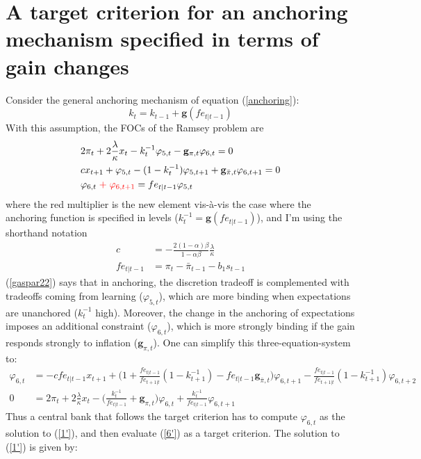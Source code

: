 \documentclass[11pt]{article}
\renewcommand{\[}{\begin{equation}}
\renewcommand{\]}{\end{equation}}
\begin{document}
\section{A target criterion for an anchoring mechanism specified in terms of gain changes}\label{app_generalTC}
Consider the general anchoring mechanism of equation (\ref{anchoring}):
\begin{equation}
k_t = k_{t-1} + \mathbf{g}(fe_{t|t-1})
\end{equation}
With this assumption, the FOCs of the Ramsey problem are
\begin{align}
& 2\pi_t + 2\frac{\lambda}{\kappa}x_t -k_t^{-1} \varphi_{5,t} - \mathbf{g}_{\pi,t}\varphi_{6,t}  = 0 \label{gaspar22_general}\\
& c x_{t+1} + \varphi_{5,t} -(1-k_t^{-1})\varphi_{5,t+1} +\mathbf{g}_{\bar{\pi},t}\varphi_{6,t+1} = 0 \label{gaspar21_general}\\
& \varphi_{6,t} \; \textcolor{red}{+\; \varphi_{6,t+1}} = fe_{t|t-1} \varphi_{5,t} \label{constraints_general}
\end{align}
where the red multiplier is the new element vis-\`a-vis the case where the anchoring function is specified in levels ($k_t^{-1} = \mathbf{g}(fe_{t|t-1})$), and I'm using the shorthand notation
\begin{align}
c & = -\frac{2(1-\alpha)\beta}{1-\alpha\beta}\frac{\lambda}{\kappa} \\ 
fe_{t|t-1} & = \pi_t - \bar{\pi}_{t-1}-b_1 s_{t-1}
\end{align}
(\ref{gaspar22}) says that in anchoring, the discretion tradeoff is complemented with tradeoffs coming from learning ($\varphi_{5,t}$), which are more binding when expectations are unanchored ($k_{t}^{-1}$ high). Moreover, the change in the anchoring of expectations imposes an additional constraint ($\varphi_{6,t}$), which is more strongly binding if the gain responds strongly to inflation ($\mathbf{g}_{\pi,t}$).
One can simplify this three-equation-system to:
\begin{align}
\varphi_{6,t} & = -c fe_{t|t-1} x_{t+1} + \bigg(1+ \frac{fe_{t|t-1}}{fe_{t+1|t}}(1-k_{t+1}^{-1}) -fe_{t|t-1} \mathbf{g}_{\bar{\pi},t} \bigg) \varphi_{6,t+1} -\frac{fe_{t|t-1}}{fe_{t+1|t}}(1-k_{t+1}^{-1})\varphi_{6,t+2}\label{6'} \\
0 & = 2\pi_t + 2\frac{\lambda}{\kappa}x_t   - \bigg( \frac{k_t^{-1}}{fe_{t|t-1}} + \mathbf{g}_{\pi,t}\bigg)\varphi_{6,t} + \frac{k_t^{-1}}{fe_{t|t-1}}\varphi_{6,t+1}\label{1'}
\end{align}
Thus a central bank that follows the target criterion has to compute $\varphi_{6,t}$ as the solution to (\ref{1'}), and then evaluate (\ref{6'}) as a target criterion. The solution to (\ref{1'}) is given by:
\end{document}
